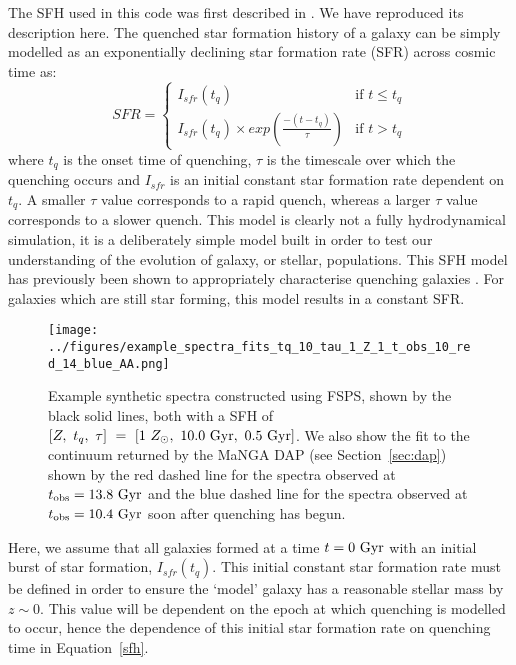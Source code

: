\documentclass[useAMS,usenatbib]{mn2e}
\begin{document}
The SFH used in this code was first described in \cite{smethurst15}. We have reproduced its description here. The quenched star formation history of a galaxy can be simply modelled as an exponentially declining star formation rate (SFR) across cosmic time as:
\begin{equation}\label{sfh}
SFR =
\begin{cases}
I_{sfr}(t_q) & \text{if } t \leq t_q \\
I_{sfr}(t_q) \times exp{\left( \frac{-(t-t_{q})}{\tau}\right)} & \text{if } t > t_q 
\end{cases}
\end{equation}
where $t_{q}$ is the onset time of quenching, $\tau$ is the timescale over which the quenching occurs and $I_{sfr}$ is an initial constant star formation rate dependent on $t_q$.  A smaller $\tau$ value corresponds to a rapid quench, whereas a larger $\tau$ value corresponds to a slower quench. This model is clearly not a fully hydrodynamical simulation, it is a deliberately simple model built in order to test our understanding of the evolution of galaxy, or stellar, populations. This SFH model has previously been shown to appropriately characterise quenching galaxies \citep{weiner06, martin07, noeske07,schawinski14}. For galaxies which are still star forming, this model results in a constant SFR.

\begin{figure*}
\centering
\texttt{[image: ../figures/example\_spectra\_fits\_tq\_10\_tau\_1\_Z\_1\_t\_obs\_10\_red\_14\_blue\_AA.png]}
\caption{Example synthetic spectra constructed using FSPS, shown by the black solid lines, both with a SFH of $[Z,~t_q,~\tau]~=~[1~Z_{\odot},~10.0~\rm{Gyr},~0.5~\rm{Gyr}]$. We also show the fit to the continuum returned by the MaNGA DAP (see Section~\ref{sec:dap}) shown by the red dashed line for the spectra observed at $t_{\rm{obs}} = 13.8~\rm{Gyr}$ and the blue dashed line for the spectra observed at $t_{\rm{obs}} = 10.4~\rm{Gyr}$ soon after quenching has begun.}
\label{fig:spectrafit}
\end{figure*}

Here, we assume that all galaxies formed at a time $t=0~\rm{Gyr}$ with an initial burst of star formation, $I_{sfr}(t_q)$. This initial constant star formation rate must be defined in order to ensure the `model' galaxy  has a reasonable stellar mass by $z\sim0$. This value will be dependent on the epoch at which quenching is modelled to occur, hence the dependence of this initial star formation rate on quenching time in Equation~\ref{sfh}. 
\end{document}
